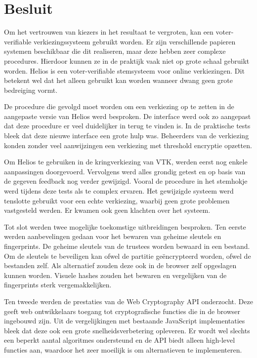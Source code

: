 % 
%

\chapter{Besluit}
\label{chap:besluit}

Om het vertrouwen van kiezers in het resultaat te vergroten, kan een voter-verifiable verkiezingssysteem gebruikt worden. Er zijn verschillende papieren systemen beschikbaar die dit realiseren, maar deze hebben zeer complexe procedures. Hierdoor kunnen ze in de praktijk vaak niet op grote schaal gebruikt worden. Helios is een voter-verifiable stemsysteem voor online verkiezingen. Dit betekent wel dat het alleen gebruikt kan worden wanneer dwang geen grote bedreiging vormt.

\npar De procedure die gevolgd moet worden om een verkiezing op te zetten in de aangepaste versie van Helios werd besproken. De interface werd ook zo aangepast dat deze procedure er veel duidelijker in terug te vinden is. In de praktische tests bleek dat deze nieuwe interface een grote hulp was. Beheerders van de verkiezing konden zonder veel aanwijzingen een verkiezing met threshold encryptie opzetten.

\npar Om Helios te gebruiken in de kringverkiezing van VTK, werden eerst nog enkele aanpassingen doorgevoerd. Vervolgens werd alles grondig getest en op basis van de gegeven feedback nog verder gewijzigd. Vooral de procedure in het stemhokje werd tijdens deze tests als te complex ervaren. Het gewijzigde systeem werd tenslotte gebruikt voor een echte verkiezing, waarbij geen grote problemen vastgesteld werden. Er kwamen ook geen klachten over het systeem.

\npar Tot slot werden twee mogelijke toekomstige uitbreidingen besproken. Ten eerste werden aanbevelingen gedaan voor het bewaren van geheime sleutels en fingerprints. De geheime sleutels van de trustees worden bewaard in een bestand. Om de sleutels te beveiligen kan ofwel de partitie ge\"encrypteerd worden, ofwel de bestanden zelf. Als alternatief zouden deze ook in de browser zelf opgeslagen kunnen worden. Visuele hashes zouden het bewaren en vergelijken van de fingerprints sterk vergemakkelijken.

\npar Ten tweede werden de prestaties van de Web Cryptography API onderzocht. Deze geeft web ontwikkelaars toegang tot cryptografische functies die in de browser ingebouwd zijn. Uit de vergelijkingen met bestaande JavaScript implementaties bleek dat deze ook een grote snelheidsverbetering opleveren. Er wordt wel slechts een beperkt aantal algoritmes ondersteund en de API biedt alleen high-level functies aan, waardoor het zeer moeilijk is om alternatieven te implementeren.
